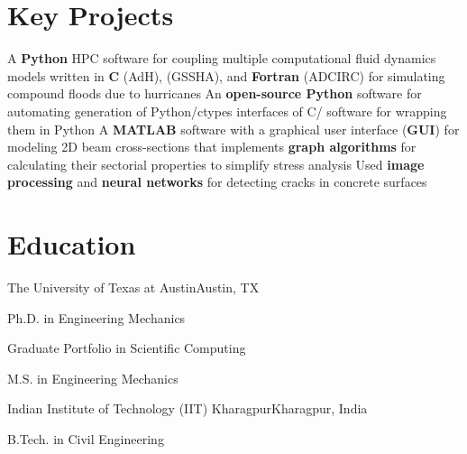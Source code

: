 \documentclass[letterpaper,10pt]{article}
\begin{document}
  \resumeSubHeadingListEnd

\section{Key Projects}
  \resumeSubItemListStart
      {A \textbf{Python} HPC software for coupling multiple computational fluid
      dynamics models written in \textbf{C} (AdH), \textbf{\CC{}} (GSSHA), and
      \textbf{Fortran} (ADCIRC) for simulating compound floods due to hurricanes}
      {An \textbf{open-source Python} software for automating
      generation of Python/ctypes interfaces of C/\CC{} software for wrapping
      them in Python}
      {A \textbf{MATLAB} software with a graphical user interface (\textbf{GUI})
      for modeling 2D beam cross-sections that implements \textbf{graph
      algorithms} for calculating their sectorial properties to simplify stress
      analysis}
      {Used \textbf{image processing} and \textbf{neural networks} for detecting
      cracks in concrete surfaces}
  \resumeSubItemListEnd

\section{Education}
  \resumeSubHeadingListStart

    \resumeSubheading
      {The University of Texas at Austin}{Austin, TX}

      \resumeSubSubheading
        {Ph.D. in Engineering Mechanics}{}

      \resumeSubSubheading
        {Graduate Portfolio in Scientific Computing}{}

      \resumeSubSubheading
        {M.S. in Engineering Mechanics}{}

    \resumeSubheading
      {Indian Institute of Technology (IIT) Kharagpur}{Kharagpur, India}

      \resumeSubSubheading
        {B.Tech. in Civil Engineering}{}

  \resumeSubHeadingListEnd
\end{document}
